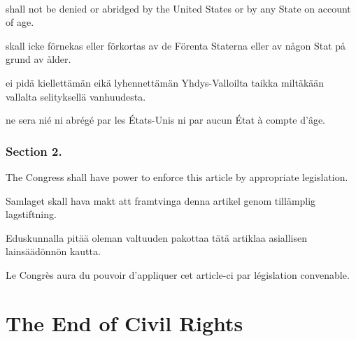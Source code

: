 \documentclass[a4,landscape,12pt]{article}
\begin{document}
~

\begin{minipage}[t]{0.22\textwidth}
shall not be denied or abridged by the United States or by any State on account of age.
\end{minipage}\textwidth
\begin{minipage}[t]{0.22\textwidth}
skall icke förnekas eller förkortas av de Förenta Staterna eller av någon Stat på grund av ålder.
\end{minipage}\textwidth
\begin{minipage}[t]{0.22\textwidth}
	 ei pidä kiellettämän eikä lyhennettämän Yhdys-Valloilta taikka miltäkään vallalta selityksellä vanhuudesta.
\end{minipage}\textwidth
\begin{minipage}[t]{0.22\textwidth}
	ne sera nié ni abrégé par les États-Unis ni par aucun État à compte d'âge.
	\end{minipage}

\subsubsection*{Section 2.}
\begin{minipage}[t]{0.22\textwidth}
	The Congress shall have power to enforce this article by appropriate legislation.
\end{minipage}\textwidth
\begin{minipage}[t]{0.22\textwidth}
	Samlaget skall hava makt att framtvinga denna artikel genom tillämplig lagstiftning.
\end{minipage}\textwidth
\begin{minipage}[t]{0.22\textwidth}
	Eduskunnalla pitää oleman valtuuden pakottaa tätä artiklaa asiallisen lainsäädönnön kautta.
\end{minipage}\textwidth
\begin{minipage}[t]{0.22\textwidth}
Le Congrès aura du pouvoir d'appliquer cet article-ci par législation convenable.
\end{minipage}


\section*{The End of Civil Rights}
\end{document}
